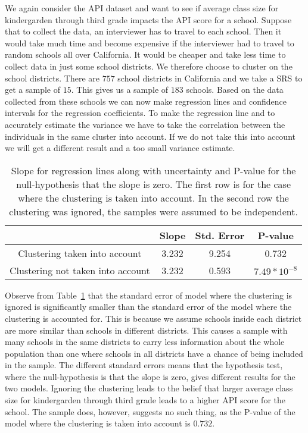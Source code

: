 \documentclass{article}
\begin{document}
\begin{example}
  We again consider the API dataset and want to see if average class size for
  kindergarden through third grade
  impacts the API score for a school. Suppose that to collect the data, an
  interviewer has to travel to each school. Then it would take much time and
  become expensive if the interviewer had to travel to random schools all over
  California. It would be cheaper and take less time to
  collect data in just some school districts. We therefore choose to cluster
  on the school districts. There are \(757\) school districts in California and we take a SRS to
  get a sample of \(15\). This gives us a sample of \(183\) schools. Based on
  the data collected from these schools we can now make regression lines and
  confidence intervals for the regression coefficients.
  To make the regression line and to accurately estimate the variance we have to
  take the correlation between the individuals in the same cluster into account.
  If we do not take this into account we will get a different result and a too
  small variance estimate.

  \begin{table}
    \centering
    \begin{tabular}{c|ccc}
     & Slope & Std. Error & P-value \\ 
      \hline
      Clustering taken into account & 3.232 & 9.254 & 0.732 \\
      Clustering not taken into account & 3.232 & 0.593 & \(7.49 * 10^{-8}\) \\
    \end{tabular}
    \caption{Slope for regression lines along with uncertainty and P-value for
      the null-hypothesis that the slope is zero. The first row is for the case
      where the clustering is taken into account. In the second row the
      clustering was ignored, the samples were assumed to be independent.}
    \label{tab:exClust}
  \end{table}

  Observe from Table~\ref{tab:exClust} that the standard error of model where
  the clustering is ignored is significantly smaller than the standard error of
  the model where the clustering is accounted for. This is because we assume
  schools inside each district are more similar than schools in different
  districts. This causes a sample with many schools in the same districts to
  carry less information about the whole population than one where schools in
  all districts have a chance of being included in the sample. The different
  standard errors means that the hypothesis
  test, where the null-hypothesis is that the slope is zero, gives different
  results for the two models. Ignoring the clustering leads to the belief that larger average
  class size for kindergarden through third grade leads to a higher API score
  for the school. The sample does, however, suggests no such thing, as the P-value
  of the model where the clustering is taken into account is \(0.732\).


\end{example}
\end{document}
